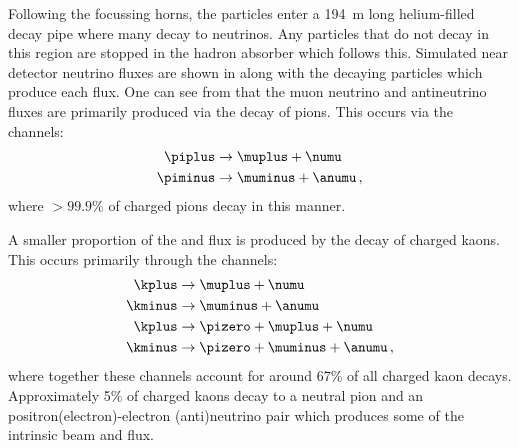 Following the focussing horns, the particles enter a \SI{194}{\metre} long helium-filled decay pipe where many decay to neutrinos.
Any particles that do not decay in this region are stopped in the hadron absorber which follows this.
Simulated near detector neutrino fluxes are shown in  along with the decaying particles which produce each flux.
One can see from  that the muon neutrino and antineutrino fluxes are primarily produced via the decay of pions.
This occurs via the channels:
\begin{align}
  \piplus &\rightarrow \muplus + \numu \\
  \piminus &\rightarrow \muminus + \anumu \, ,
\end{align}
where $>99.9\%$ of charged pions decay in this manner.

A smaller proportion of the \numu and \anumu flux is produced by the decay of charged kaons.
This occurs primarily through the channels:
\begin{align}
  \kplus &\rightarrow \muplus + \numu \\
  \kminus &\rightarrow \muminus + \anumu \\
  \kplus &\rightarrow \pizero + \muplus + \numu \\
  \kminus &\rightarrow \pizero + \muminus + \anumu \, ,
\end{align}
where together these channels account for around 67\% of all charged kaon decays.
Approximately 5\% of charged kaons decay to a neutral pion and an positron(electron)-electron (anti)neutrino pair which produces some of the intrinsic beam \nue and \anue flux.

